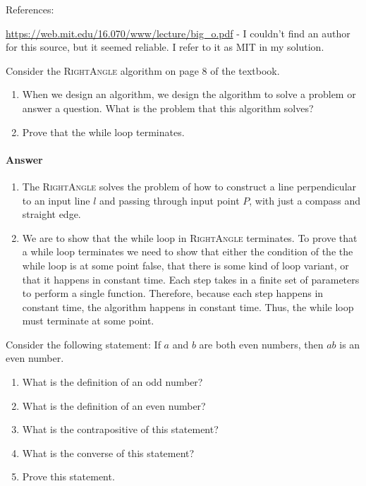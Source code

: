 \documentclass{article}
\begin{document}
References: 

\url{https://web.mit.edu/16.070/www/lecture/big_o.pdf} - I couldn't find an author for this source, but it seemed reliable. I refer to it as MIT in my solution. 




\nextprob
Consider the \textsc{RightAngle} algorithm on page 8 of the textbook.
\begin{enumerate}
    \item When we design an algorithm, we design the algorithm to solve a
        problem or answer a question.  What is the problem that this algorithm
        solves?
    \item Prove that the while loop terminates.
\end{enumerate}

\paragraph{Answer}


\begin{enumerate}
    \item The \textsc{RightAngle} solves the problem of how to construct a line perpendicular to an input line $l$ and passing through input point $P$, with just a compass and straight edge. 
    \item We are to show that the while loop in \textsc{RightAngle} terminates. To prove that a while loop terminates we need to show that either the condition of the
    the while loop is at some point false, that there is some kind of loop variant, or that it happens in constant time. Each step takes in a finite set of parameters to perform a single function. Therefore, because each 
    step happens in constant time, the algorithm happens in constant time. Thus, the while loop must terminate at some point.  

\end{enumerate}




\nextprob
Consider the following statement: If $a$ and $b$ are both even numbers, then $ab$ is
an even number.
\begin{enumerate}
    \item What is the definition of an odd number?
    \item What is the definition of an even number?
    \item What is the contrapositive of this statement?
    \item What is the converse of this statement?
    \item Prove this statement.
\end{enumerate}
\end{document}
